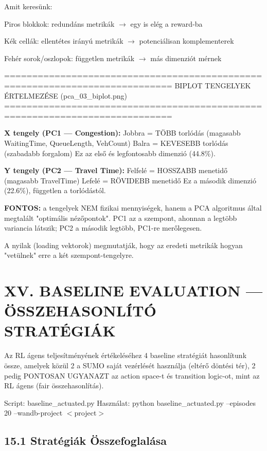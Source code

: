 \documentclass[11pt,a4paper]{article}
\begin{document}
Amit keresünk:
\par\noindent\hspace*{1em}\textbullet{} Piros blokkok: redundáns metrikák $\rightarrow$ egy is elég a reward-ba
\par\noindent\hspace*{1em}\textbullet{} Kék cellák: ellentétes irányú metrikák $\rightarrow$ potenciálisan komplementerek
\par\noindent\hspace*{1em}\textbullet{} Fehér sorok/oszlopok: független metrikák $\rightarrow$ más dimenziót mérnek

============================================================================
BIPLOT TENGELYEK ÉRTELMEZÉSE (pca\_03\_biplot.png)
============================================================================

\textbf{X tengely (PC1 — Congestion):}
Jobbra = TÖBB torlódás (magasabb WaitingTime, QueueLength, VehCount)
Balra = KEVESEBB torlódás (szabadabb forgalom)
Ez az első és legfontosabb dimenzió (44.8\%).

\textbf{Y tengely (PC2 — Travel Time):}
Felfelé = HOSSZABB menetidő (magasabb TravelTime)
Lefelé = RÖVIDEBB menetidő
Ez a második dimenzió (22.6\%), független a torlódástól.

\textbf{FONTOS:} a tengelyek NEM fizikai mennyiségek, hanem a PCA algoritmus
által megtalált "optimális nézőpontok". PC1 az a szempont, ahonnan
a legtöbb variancia látszik; PC2 a második legtöbb, PC1-re merőlegesen.

A nyilak (loading vektorok) megmutatják, hogy az eredeti metrikák
hogyan "vetülnek" erre a két szempont-tengelyre.


\section*{XV. BASELINE EVALUATION — ÖSSZEHASONLÍTÓ STRATÉGIÁK}

Az RL ágens teljesítményének értékeléséhez 4 baseline stratégiát
hasonlítunk össze, amelyek közül 2 a SUMO saját vezérlését használja
(eltérő döntési tér), 2 pedig PONTOSAN UGYANAZT az action space-t és
transition logic-ot, mint az RL ágens (fair összehasonlítás).

Script: baseline\_actuated.py
Használat: python baseline\_actuated.py --episodes 20 --wandb-project $<$project$>$

\subsection*{15.1 Stratégiák Összefoglalása}
\end{document}
